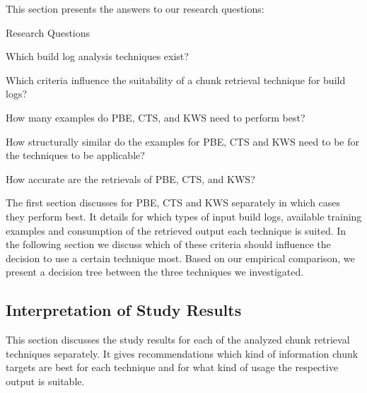 
This section presents the answers to our research questions:
\begin{simplebox}{Research Questions}
\begin{itemize}
  \item[\textbf{RQ1:}] Which build log analysis techniques exist?
  \item[\textbf{RQ2:}] Which criteria influence the suitability of a
  chunk retrieval technique for build logs?

  {\small \item[\textbf{~~ RQ2.1:}] How many examples do PBE, CTS,
  and KWS need to perform best?
  \item[\textbf{~~ RQ2.2:}] How structurally similar do the examples
  for PBE, CTS and KWS need to be for the techniques to be applicable?
  \item[\textbf{~~ RQ2.3:}] How accurate are the retrievals of PBE, CTS,
  and KWS?}
\end{itemize}
\end{simplebox}

The first section discusses for PBE, CTS and KWS separately in which
cases they perform best.
It details for which types of input build
logs, available training examples and consumption of the retrieved
output each technique is suited.
In the following section we discuss
which of these criteria should influence the decision to use a certain
technique most.
Based on our empirical comparison, we present a
decision tree between the three techniques we investigated.

\subsection{Interpretation of Study Results}
This section discusses the study results for each of the analyzed
chunk retrieval techniques separately.
It gives recommendations which
kind of information chunk targets are best for each technique and for
what kind of usage the respective output is suitable.

